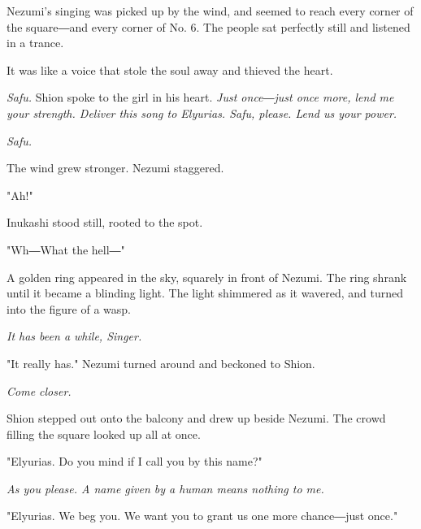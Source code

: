 Nezumi's singing was picked up by the wind, and seemed to reach every
corner of the square―and every corner of No. 6. The people sat perfectly
still and listened in a trance.

It was like a voice that stole the soul away and thieved the heart.

\myspace

\emph{Safu.} Shion spoke to the girl in his heart. \emph{Just once―just once more,
lend me your strength. Deliver this song to Elyurias. Safu, please. Lend
us your power.}


\emph{Safu.}

\myspace

The wind grew stronger. Nezumi staggered.

"Ah!"

Inukashi stood still, rooted to the spot.

"Wh―What the hell―"

A golden ring appeared in the sky, squarely in front of Nezumi. The ring
shrank until it became a blinding light. The light shimmered as it
wavered, and turned into the figure of a wasp.

\myspace

\emph{It has been a while, Singer.}

\myspace

"It really has." Nezumi turned around and beckoned to Shion.

\myspace

\emph{Come closer.}

\myspace

Shion stepped out onto the balcony and drew up beside Nezumi. The crowd
filling the square looked up all at once.

"Elyurias. Do you mind if I call you by this name?"

\myspace

\emph{As you please. A name given by a human means nothing to me.}

\myspace

"Elyurias. We beg you. We want you to grant us one more chance―just
once."

